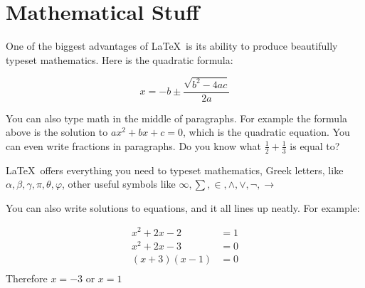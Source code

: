 \documentclass[11pt]{article}
\begin{document}
\section{Mathematical Stuff}

One of the biggest advantages of \LaTeX~is its ability to produce beautifully typeset mathematics. Here is the quadratic formula:

$$x = -b \pm \frac{\sqrt{b^2-4ac}}{2a}$$

\noindent
You can also type math in the middle of paragraphs. For example the formula above is the solution to $ax^2+bx+c = 0$, which is the quadratic equation. You can even write fractions in paragraphs. Do you know what $\frac{1}{2} + \frac{1}{3}$ is equal to?

\LaTeX~offers everything you need to typeset mathematics, Greek letters, like $\alpha, \beta, \gamma, \pi, \theta, \varphi$, other useful symbols like $\infty, \sum, \in, \land, \lor,\lnot, \to$

You can also write solutions to equations, and it all lines up neatly. For example:

\begin{align*}
    x^2 + 2x - 2 &= 1\\
    x^2 + 2x - 3 &= 0\\
    (x + 3)(x - 1) &= 0\\
\end{align*}
Therefore $x = -3$ or $x = 1$
\end{document}
